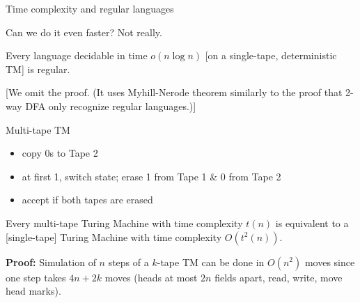 \documentclass[handout]{beamer}
\begin{document}
\begin{frame}{Time complexity and regular languages}
    
    Can we do it even faster? Not really.

    \begin{theorem}
        Every language decidable in time $o(n \log n)$ [on a single-tape, deterministic TM] is regular. %
    \end{theorem}

    [We omit the proof. (It uses Myhill-Nerode theorem similarly to the proof that 2-way DFA only recognize regular languages.)]

\end{frame}

    
\begin{frame}{Multi-tape TM}
    
    \begin{example}[Multi-tape TM for $L=\{0^i1^i \mid  i\geq 0\}$]
        \begin{itemize}
            \item copy 0s to Tape 2
            \item at first 1, switch state; erase 1 from Tape 1 \& 0 from Tape 2
            \item accept if both tapes are erased
        \end{itemize}

    \end{example}
    
    \begin{lemma}
        Every multi-tape Turing Machine with time complexity $t(n)$ is equivalent to a [single-tape] Turing Machine with time complexity $O(t^2(n))$.
    \end{lemma}
    \textbf{Proof:} Simulation of $n$ steps of a $k$-tape TM can be done in $O(n^2)$ moves since one step takes $4n+2k$ moves (heads at most $2n$ fields apart, read, write, move head marks).\hfill\qedsymbol

\end{frame}
\end{document}
